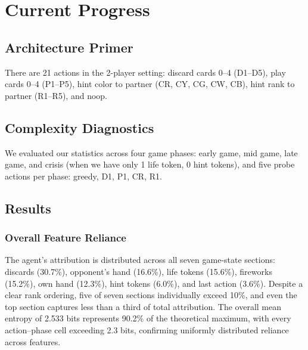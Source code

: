 \documentclass{article}
\begin{document}



\section{Current Progress}

\subsection{Architecture Primer}

There are 21 actions in the 2-player setting: discard cards 0--4 (D1--D5), play cards 0--4 (P1--P5), hint color to partner (CR, CY, CG, CW, CB), hint rank to partner (R1--R5), and noop.

\subsection{Complexity Diagnostics}

We evaluated our statistics across four game phases: early game, mid game, late game, and crisis (when we have only 1 life token, 0 hint tokens), and five probe actions per phase: greedy, D1, P1, CR, R1.

\subsection{Results}

\subsubsection{Overall Feature Reliance}

The agent's attribution is distributed across all seven game-state sections: discards (30.7\%), opponent's hand (16.6\%), life tokens (15.6\%), fireworks (15.2\%), own hand (12.3\%), hint tokens (6.0\%), and last action (3.6\%). Despite a clear rank ordering, five of seven sections individually exceed 10\%, and even the top section captures less than a third of total attribution. The overall mean entropy of 2.533 bits represents 90.2\% of the theoretical maximum, with every action--phase cell exceeding 2.3 bits, confirming uniformly distributed reliance across features.
\end{document}
